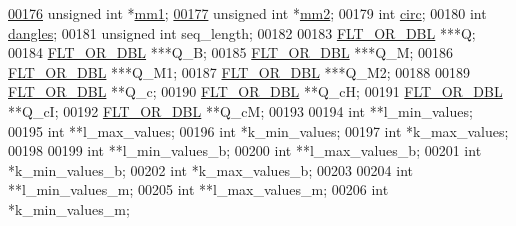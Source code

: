 \begin{DoxyCode}
\hypertarget{2Dpfold_8h_source.tex_l00176}{}\hyperlink{structTwoDpfold__vars_a7c9e9af6224d4696118e05835441863d}{00176}   \textcolor{keywordtype}{unsigned} \textcolor{keywordtype}{int}    *\hyperlink{structTwoDpfold__vars_a7c9e9af6224d4696118e05835441863d}{mm1};           
\hypertarget{2Dpfold_8h_source.tex_l00177}{}\hyperlink{structTwoDpfold__vars_affb913470783f9edb12a0bfc22466269}{00177}   \textcolor{keywordtype}{unsigned} \textcolor{keywordtype}{int}    *\hyperlink{structTwoDpfold__vars_affb913470783f9edb12a0bfc22466269}{mm2};           
00179   \textcolor{keywordtype}{int}             \hyperlink{group__model__details_gaf9202a1a09f5828dc731e2d9a10fa111}{circ};
00180   \textcolor{keywordtype}{int}             \hyperlink{group__model__details_ga72b511ed1201f7e23ec437e468790d74}{dangles};
00181   \textcolor{keywordtype}{unsigned} \textcolor{keywordtype}{int}    seq\_length;
00182 
00183   \hyperlink{group__data__structures_ga31125aeace516926bf7f251f759b6126}{FLT\_OR\_DBL}      ***Q;
00184   \hyperlink{group__data__structures_ga31125aeace516926bf7f251f759b6126}{FLT\_OR\_DBL}      ***Q\_B;
00185   \hyperlink{group__data__structures_ga31125aeace516926bf7f251f759b6126}{FLT\_OR\_DBL}      ***Q\_M;
00186   \hyperlink{group__data__structures_ga31125aeace516926bf7f251f759b6126}{FLT\_OR\_DBL}      ***Q\_M1;
00187   \hyperlink{group__data__structures_ga31125aeace516926bf7f251f759b6126}{FLT\_OR\_DBL}      ***Q\_M2;
00188 
00189   \hyperlink{group__data__structures_ga31125aeace516926bf7f251f759b6126}{FLT\_OR\_DBL}      **Q\_c;
00190   \hyperlink{group__data__structures_ga31125aeace516926bf7f251f759b6126}{FLT\_OR\_DBL}      **Q\_cH;
00191   \hyperlink{group__data__structures_ga31125aeace516926bf7f251f759b6126}{FLT\_OR\_DBL}      **Q\_cI;
00192   \hyperlink{group__data__structures_ga31125aeace516926bf7f251f759b6126}{FLT\_OR\_DBL}      **Q\_cM;
00193 
00194   \textcolor{keywordtype}{int}             **l\_min\_values;
00195   \textcolor{keywordtype}{int}             **l\_max\_values;
00196   \textcolor{keywordtype}{int}             *k\_min\_values;
00197   \textcolor{keywordtype}{int}             *k\_max\_values;
00198 
00199   \textcolor{keywordtype}{int}             **l\_min\_values\_b;
00200   \textcolor{keywordtype}{int}             **l\_max\_values\_b;
00201   \textcolor{keywordtype}{int}             *k\_min\_values\_b;
00202   \textcolor{keywordtype}{int}             *k\_max\_values\_b;
00203 
00204   \textcolor{keywordtype}{int}             **l\_min\_values\_m;
00205   \textcolor{keywordtype}{int}             **l\_max\_values\_m;
00206   \textcolor{keywordtype}{int}             *k\_min\_values\_m;

\end{DoxyCode}

